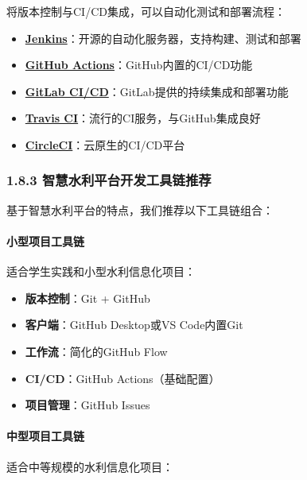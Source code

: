 将版本控制与CI/CD集成，可以自动化测试和部署流程：

\begin{itemize}
\tightlist
\item
  \textbf{\href{https://www.jenkins.io/}{Jenkins}}：开源的自动化服务器，支持构建、测试和部署
\item
  \textbf{\href{https://github.com/features/actions}{GitHub
  Actions}}：GitHub内置的CI/CD功能
\item
  \textbf{\href{https://docs.gitlab.com/ee/ci/}{GitLab
  CI/CD}}：GitLab提供的持续集成和部署功能
\item
  \textbf{\href{https://travis-ci.org/}{Travis
  CI}}：流行的CI服务，与GitHub集成良好
\item
  \textbf{\href{https://circleci.com/}{CircleCI}}：云原生的CI/CD平台
\end{itemize}

\subsubsection{1.8.3
智慧水利平台开发工具链推荐}\label{ux667aux6167ux6c34ux5229ux5e73ux53f0ux5f00ux53d1ux5de5ux5177ux94feux63a8ux8350}

基于智慧水利平台的特点，我们推荐以下工具链组合：

\paragraph{小型项目工具链}\label{ux5c0fux578bux9879ux76eeux5de5ux5177ux94fe}

适合学生实践和小型水利信息化项目：

\begin{itemize}
\tightlist
\item
  \textbf{版本控制}：Git + GitHub
\item
  \textbf{客户端}：GitHub Desktop或VS Code内置Git
\item
  \textbf{工作流}：简化的GitHub Flow
\item
  \textbf{CI/CD}：GitHub Actions（基础配置）
\item
  \textbf{项目管理}：GitHub Issues
\end{itemize}

\paragraph{中型项目工具链}\label{ux4e2dux578bux9879ux76eeux5de5ux5177ux94fe}

适合中等规模的水利信息化项目：

